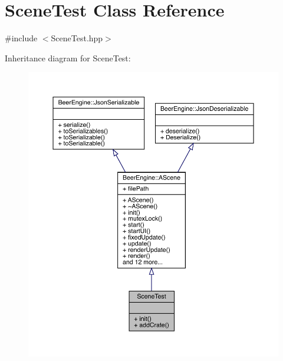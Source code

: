\hypertarget{class_scene_test}{}\section{Scene\+Test Class Reference}
\label{class_scene_test}


{\ttfamily \#include $<$Scene\+Test.\+hpp$>$}



Inheritance diagram for Scene\+Test\+:
\nopagebreak
\begin{figure}[H]
\begin{center}
\leavevmode
\includegraphics[width=350pt]{class_scene_test__inherit__graph}
\end{center}
\end{figure}


